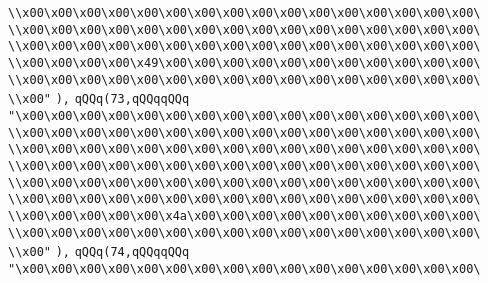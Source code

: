 \verb|\\x00\x00\x00\x00\x00\x00\x00\x00\x00\x00\x00\x00\x00\x00\x00\x00\|\newline
\verb|\\x00\x00\x00\x00\x00\x00\x00\x00\x00\x00\x00\x00\x00\x00\x00\x00\|\newline
\verb|\\x00\x00\x00\x00\x00\x00\x00\x00\x00\x00\x00\x00\x00\x00\x00\x00\|\newline
\verb|\\x00\x00\x00\x00\x49\x00\x00\x00\x00\x00\x00\x00\x00\x00\x00\x00\|\newline
\verb|\\x00\x00\x00\x00\x00\x00\x00\x00\x00\x00\x00\x00\x00\x00\x00\x00\|\newline
\verb|\\x00"|\newline
\verb|),|\newline
\verb|qQQq(73,qQQqqQQq|\newline
\verb|"\x00\x00\x00\x00\x00\x00\x00\x00\x00\x00\x00\x00\x00\x00\x00\x00\|\newline
\verb|\\x00\x00\x00\x00\x00\x00\x00\x00\x00\x00\x00\x00\x00\x00\x00\x00\|\newline
\verb|\\x00\x00\x00\x00\x00\x00\x00\x00\x00\x00\x00\x00\x00\x00\x00\x00\|\newline
\verb|\\x00\x00\x00\x00\x00\x00\x00\x00\x00\x00\x00\x00\x00\x00\x00\x00\|\newline
\verb|\\x00\x00\x00\x00\x00\x00\x00\x00\x00\x00\x00\x00\x00\x00\x00\x00\|\newline
\verb|\\x00\x00\x00\x00\x00\x00\x00\x00\x00\x00\x00\x00\x00\x00\x00\x00\|\newline
\verb|\\x00\x00\x00\x00\x00\x4a\x00\x00\x00\x00\x00\x00\x00\x00\x00\x00\|\newline
\verb|\\x00\x00\x00\x00\x00\x00\x00\x00\x00\x00\x00\x00\x00\x00\x00\x00\|\newline
\verb|\\x00"|\newline
\verb|),|\newline
\verb|qQQq(74,qQQqqQQq|\newline
\verb|"\x00\x00\x00\x00\x00\x00\x00\x00\x00\x00\x00\x00\x00\x00\x00\x00\|\newline
